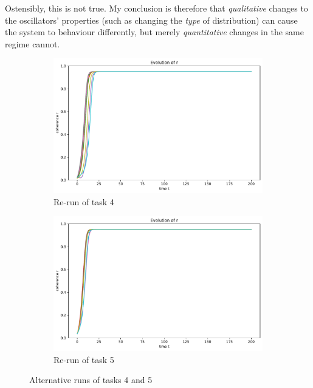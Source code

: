 \documentclass[11pt,a4paper]{article}
\begin{document}
Ostensibly, this is not true. 
My conclusion is therefore that \textit{qualitative} changes to the oscillators' properties (such as changing the \textit{type} of distribution) can cause the system to behaviour differently, but merely \textit{quantitative} changes in the same regime cannot.



\begin{figure}[h]
	\centering
	\begin{subfigure}{0.62\textwidth}
		\includegraphics[width=\textwidth]{graphics/4_t-vs-r_fixedOmegas_omegaDistr=uniform_N=2000_1611599683.pdf}
		\caption{Re-run of task 4}
		\label{4re}
	\end{subfigure}
	\begin{subfigure}{0.62\textwidth}
		\includegraphics[width=\textwidth]{graphics/5_t-vs-r_fixedThetas_omegaDistr=uniform_N=2000_1611601465.pdf}
		\caption{Re-run of task 5}
		\label{5re}
	\end{subfigure}
	\caption{Alternative runs of tasks 4 and 5}
\end{figure}
\end{document}
